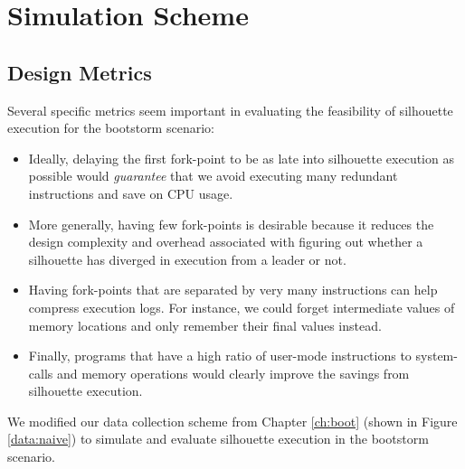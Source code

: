 \section{Simulation Scheme} \label{silsimulation}

\subsection{Design Metrics}

Several specific metrics seem important in
evaluating the feasibility of silhouette
execution for the bootstorm scenario:
\begin{itemize}
\item Ideally, delaying the first fork-point
to be as late into silhouette execution as possible
would {\em guarantee} that we avoid
executing many redundant instructions and
save on CPU usage.
\item More generally, having few
fork-points is desirable because it reduces
the design complexity and overhead associated with 
figuring out whether a silhouette has diverged
in execution from a leader or not.
\item Having fork-points that are
separated by very many instructions
can help compress execution logs.
For instance, we could forget intermediate
values of memory locations and only
remember their final values instead.
\item Finally, programs that have a high
ratio of user-mode instructions to system-calls
and memory operations would clearly 
improve the savings from silhouette execution.
\end{itemize}


We modified our data collection scheme from Chapter \ref{ch:boot} (shown in 
Figure \ref{data:naive}) to simulate and
evaluate silhouette execution in the bootstorm scenario.

